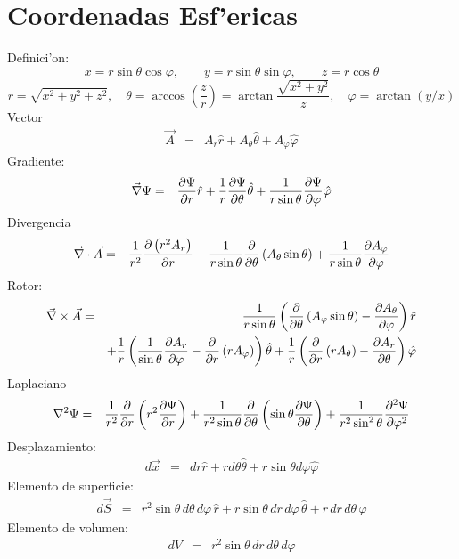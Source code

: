 \section{Coordenadas Esf'ericas}
Definici'on:
\begin{equation}
    x  =  r\sin\theta\cos\varphi, \qquad
    y  =  r\sin\theta\sin\varphi , \qquad
    z  =  r\cos\theta
\end{equation}
\begin{equation}
    r  =  \sqrt{x^2 + y^2 + z^2} , \quad
    \theta  =  \arccos(\frac{z}{r}) = \arctan{\frac{\sqrt{x^2+y^2}}{z}}, \quad
    \varphi  =  \arctan{(y/x)}
\end{equation}
Vector
\begin{eqnarray}
\vec{A}
&=& A_r {\hat r} + A_\theta {\hat \theta} +
A_\varphi {\hat \varphi}
\end{eqnarray}
Gradiente:
\begin{eqnarray}
 \vec\nabla\Psi
 &=& {\partial\Psi\over \partial r} {\hat r}
  + {1 \over r}{\partial\Psi\over \partial \theta} {\hat \theta}
  + {1 \over r\sin\theta}{\partial\Psi\over \partial \varphi} {\hat \varphi}
\end{eqnarray}
Divergencia
\begin{eqnarray}
 \vec\nabla \cdot \vec{A}
&=& {1 \over r^2}{\partial \left( r^2 A_r \right) \over \partial r}
  + {1 \over r\sin\theta}{\partial \over \partial \theta} \left(
A_\theta\sin\theta \right)
  + {1 \over r\sin\theta}{\partial A_\varphi \over \partial \varphi}
\end{eqnarray}
Rotor:
\begin{eqnarray}
\vec\nabla \times  \vec{A}
&=&  {1 \over r\sin\theta}\left({\partial \over \partial \theta}
\left( A_\varphi\sin\theta \right)    - {\partial A_\theta \over \partial
\varphi}\right) {\hat r} \nonumber\\
&&+    {1 \over r}\left({1 \over \sin\theta}{\partial A_r \over \partial
\varphi} - {\partial \over \partial r} \left( r A_\varphi \right) \right)
 {\hat \theta}  +   {1 \over r}\left({\partial \over \partial r} \left( r
A_\theta
\right)  - {\partial A_r \over \partial \theta}\right)  {\hat \varphi}
\end{eqnarray}
Laplaciano
\begin{eqnarray}
 \nabla^2 \Psi
&=&  {1 \over r^2}{\partial \over \partial r}\left(r^2 {\partial\Psi\over
\partial r}\right)   + {1 \over r^2\sin\theta}{\partial \over \partial
\theta}\left(\sin\theta {\partial\Psi\over \partial \theta}\right)
  + {1 \over r^2\sin^2\theta}{\partial^2\Psi\over \partial \varphi^2}
\end{eqnarray}
Desplazamiento:
\begin{eqnarray}
 d \vec{x}
&= & dr {\hat r} + rd\theta {\hat \theta} +r\sin\theta d\varphi {\hat \varphi}
\end{eqnarray}
Elemento de superficie:
\begin{eqnarray}
 d \vec{S}
&=& r^2 \sin\theta \,d\theta \,d\varphi \, {\hat r} + r\sin\theta
\,dr\,d\varphi \, {\hat \theta} +  r\,dr\,d\theta\, {\hat \varphi}
\end{eqnarray}
Elemento de volumen:
\begin{eqnarray}
 dV
&=& r^2\sin\theta \,dr\,d\theta\, d\varphi
\end{eqnarray}
